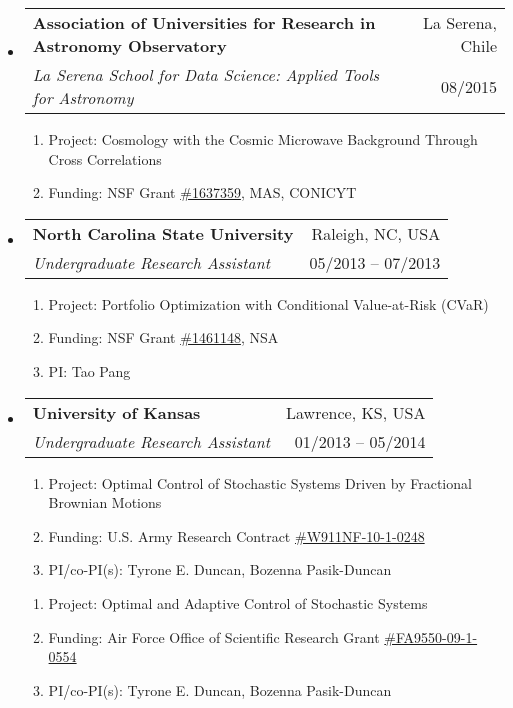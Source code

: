 \documentclass[letterpaper,10pt]{article}
\makeatletter
\newcommand{\subheadingtwolines}[4]{
\begin{tabular*}{6.55in}{l@{\cftdotfill{\cftsecdotsep}\extracolsep{\fill}}r}
#1 & #2 \\
#3 & #4 \\
\end{tabular*}}
\makeatother
\begin{document}
\begin{itemize}[leftmargin=0.4cm, itemsep=0.5cm]
\item[] \hspace{-2ex}\subheadingtwolines{\bf Association of Universities for Research in Astronomy Observatory}{La Serena, Chile}{\it La Serena School for Data Science: Applied Tools for Astronomy}{08/2015}

\begin{enumerate}[leftmargin=0.3cm, itemsep=-0.05ex]
	\item[] Project: Cosmology with the Cosmic Microwave Background Through Cross Correlations
	\item[] Funding: NSF Grant \href{https://www.nsf.gov/awardsearch/showAward?AWD_ID=1637359&HistoricalAwards=false}{\#1637359}, MAS, CONICYT
\end{enumerate}


\item[] \hspace{-2ex}\subheadingtwolines{\bf North Carolina State University}{Raleigh, NC, USA}{\it Undergraduate Research Assistant}{05/2013 -- 07/2013}

\begin{enumerate}[leftmargin=0.3cm, itemsep=-0.05ex]
	\item[] Project: Portfolio Optimization with Conditional Value-at-Risk (CVaR)
	\item[] Funding: NSF Grant \href{https://www.nsf.gov/awardsearch/showAward?AWD_ID=1461148&HistoricalAwards=false}{\#1461148}, NSA
	\item[] PI: Tao Pang
\end{enumerate}


\item[] \hspace{-2ex}\subheadingtwolines{\bf University of Kansas}{Lawrence, KS, USA}{\it Undergraduate Research Assistant}{01/2013 -- 05/2014}

\begin{enumerate}[leftmargin=0.3cm, itemsep=-0.05ex]
	\item[] Project: Optimal Control of Stochastic Systems Driven by Fractional Brownian Motions
	\item[] Funding: U.S. Army Research Contract \href{https://apps.dtic.mil/sti/pdfs/ADA614716.pdf}{\#W911NF-10-1-0248}
	\item[] PI/co-PI(s): Tyrone E. Duncan, Bozenna Pasik-Duncan
\end{enumerate}


\begin{enumerate}[leftmargin=0.3cm, itemsep=-0.05ex]
	\item[] Project: Optimal and Adaptive Control of Stochastic Systems
	\item[] Funding: Air Force Office of Scientific Research Grant \href{https://apps.dtic.mil/sti/pdfs/ADA567576.pdf}{\#FA9550-09-1-0554}
	\item[] PI/co-PI(s): Tyrone E. Duncan, Bozenna Pasik-Duncan
\end{enumerate}



\end{itemize}
\end{document}
